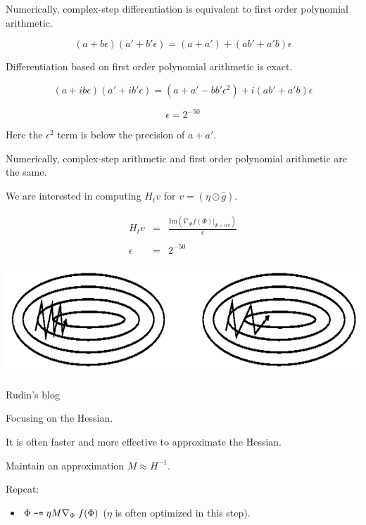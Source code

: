 {{

\vfill
Numerically, complex-step differentiation is equivalent to
first order polynomial arithmetic.

\vfill
$$(a + b\epsilon)(a' + b'\epsilon) = (a+a') + (ab' + a'b)\epsilon$$

\vfill
Differentiation based on first order polynomial arithmetic is exact.

$$(a + ib\epsilon)(a' + ib'\epsilon) = (a+a' - bb'\epsilon^2) + i(ab' + a'b)\epsilon$$

\vfill
$$\epsilon = 2^{-50}$$

\vfill
Here the $\epsilon^2$ term is below the precision of $a + a'$.

\vfill
Numerically, complex-step arithmetic and first order polynomial arithmetic are the same.



We are interested in computing $H_t v$ for $v = (\eta \odot \hat{g})$.

\vfill
\begin{eqnarray*}
  H_t v & = & \frac{\mathrm{Im}(\nabla_\Phi f(\Phi)|_{\Phi + i\epsilon v})}{\epsilon} \\
  \\
  \epsilon & = & 2^{-50}
\end{eqnarray*}




\centerline{\includegraphics[width = 6in]{../images/momentum}}
\centerline{\Large Rudin's blog}

\vfill
Focusing on the Hessian.


It is often faster and more effective to approximate the Hessian.

\vfill
Maintain an approximation $M \approx H^{-1}$.

\vfill
Repeat:

\vfill
\begin{itemize}
\item $\Phi \;\mbox{\tt -=} \; \eta M \nabla_\Phi \;f(\Phi)$ ($\eta$ is often optimized in this step).


\end{itemize}}}

